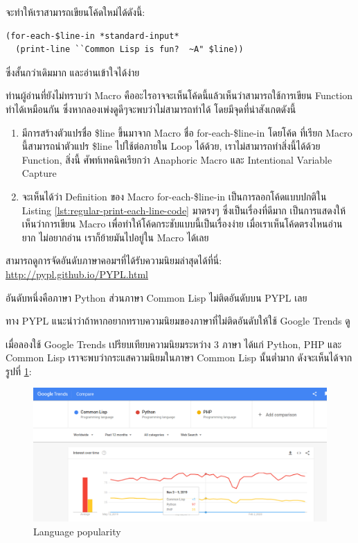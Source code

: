 \documentclass[a4paper]{article}
\begin{document}
จะทำให้เราสามารถเขียนโค้ดใหม่ได้ดังนี้:

\begin{lstlisting}[caption=โค้ดที่อ่านง่าย สบายตา ด้วยการใช้ Macro]
(for-each-$line-in *standard-input*
  (print-line ``Common Lisp is fun?  ~A" $line))
\end{lstlisting}

ซึ่งสั้นกว่าเดิมมาก และอ่านเข้าใจได้ง่าย

ท่านผู้อ่านที่ยังไม่ทราบว่า Macro คืออะไรอาจจะเห็นโค้ดนี้แล้วเห็นว่าสามารถใช้การเขียน
Function ทำได้เหมือนกัน ซึ่งหากลองเพ่งดูดีๆจะพบว่าไม่สามารถทำได้ โดยมีจุดที่น่าสังเกตดังนี้

\begin{enumerate}
  \item มีการสร้างตัวแปรชื่อ \$line ขึ้นมาจาก Macro ชื่อ for-each-\$line-in โดยโค้ด%
    ที่เรียก Macro นี้สามารถนำตัวแปร \$line ไปใช้ต่อภายใน Loop ได้ด้วย,
    เราไม่สามารถทำสิ่งนี้ได้ด้วย Function, สิ่งนี้ ศัพท์เทคนิคเรียกว่า Anaphoric Macro
    และ Intentional Variable Capture
  \item จะเห็นได้ว่า Definition ของ Macro for-each-\$line-in
    เป็นการลอกโค้ดแบบปกติใน Listing \ref{lst:regular-print-each-line-code} มาตรงๆ
    ซึ่งเป็นเรื่องที่ดีมาก เป็นการแสดงให้เห็นว่าการเขียน Macro เพื่อทำให้โค้ดกระชับแบบนี้เป็นเรื่องง่าย
    เมื่อเราเห็นโค้ดตรงไหนอ่านยาก ไม่อยากอ่าน เราก็ย้ายมันไปอยู่ใน Macro ได้เลย
\end{enumerate}



สามารถดูการจัดอันดับภาษาคอมฯที่ได้รับความนิยมล่าสุดได้ที่นี่: \href{http://pypl.github.io/PYPL.html}{http://pypl.github.io/PYPL.html}

อันดับหนึ่งคือภาษา Python ส่วนภาษา Common Lisp ไม่ติดอันดับบน PYPL เลย

ทาง PYPL แนะนำว่าถ้าหากอยากทราบความนิยมของภาษาที่ไม่ติดอันดับให้ใช้ Google Trends ดู

เมื่อลองใช้ Google Trends เปรียบเทียบความนิยมระหว่าง 3 ภาษา ได้แก่ Python, PHP
และ Common Lisp เราจะพบว่ากระแสความนิยมในภาษา Common Lisp นั้นต่ำมาก
ดังจะเห็นได้จากรูปที่ \ref{lang-pop}:

\begin{figure}[!hbtp]
  \includegraphics[width=\linewidth]{images/lang-popularity.png}
  \caption{Language popularity\label{lang-pop}}
\end{figure}
\end{document}
